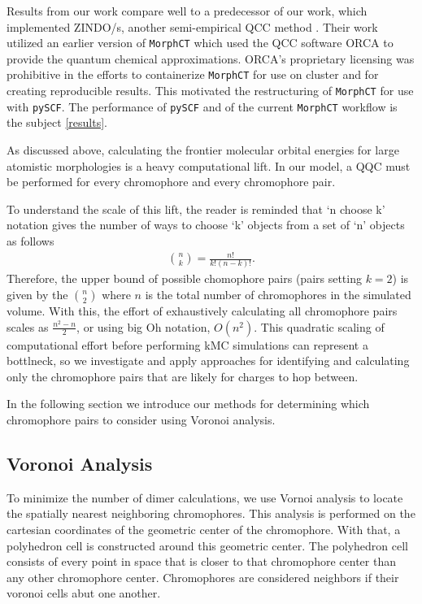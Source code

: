 Results from our work compare well to a predecessor of our work, which implemented ZINDO/s, another
semi-empirical QCC method \cite{Miller2018a}\cite{jones2017}. 
Their work utilized an earlier version of \texttt{MorphCT} which used the QCC software 
ORCA \cite{Neese2012b} to provide the quantum chemical approximations. 
ORCA's proprietary licensing was prohibitive in the efforts to containerize \texttt{MorphCT} for use on cluster and for
creating reproducible results. This motivated the restructuring of \texttt{MorphCT} for use with \texttt{pySCF}. The
performance of \texttt{pySCF} and of the current \texttt{MorphCT} workflow is the subject \autoref{results}.

As discussed above, calculating the frontier molecular orbital energies for large atomistic morphologies is
a heavy computational lift. 
In our model, a QQC must be performed for every chromophore and every chromophore pair. 

To understand the scale of this lift, the reader is reminded that
`n choose k' notation gives the number of ways to choose `k' objects from a set of 
`n' objects as follows 
\begin{align}
    {n \choose k} =  \frac{n!}{k!(n-k)!}.
\end{align}
Therefore, the upper bound of possible chomophore pairs (pairs setting $k=2$) is given by the 
$n \choose 2$ where $n$ is the total number of chromophores in the simulated volume. 
With this, the effort of exhaustively calculating all chromophore pairs scales as $\frac{n^{2} - n}{2}$, or using big Oh notation, $O(n^2)$.
This quadratic scaling of computational effort before performing kMC simulations can represent a bottlneck, so we investigate and apply approaches for identifying and calculating only the chromophore pairs that are likely for charges to hop between.

In the following section we introduce our methods for determining
which chromophore pairs to consider using Voronoi analysis. 

\subsection{Voronoi Analysis}

To minimize the number of dimer calculations, we use Vornoi analysis to locate the spatially
nearest neighboring chromophores. This analysis is performed on the cartesian coordinates of
the geometric center of the chromophore. With that, a polyhedron cell is constructed around this geometric
center. The polyhedron cell consists of every point in space that is closer to that chromophore center than
any other chromophore center. Chromophores are considered neighbors if their voronoi cells abut one another.

